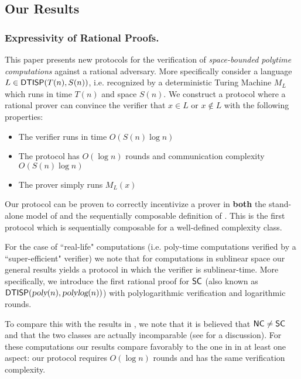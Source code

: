 \subsection{Our Results}

\subsubsection{Expressivity of Rational Proofs.}
This paper presents new protocols for the verification of {\em space-bounded polytime computations} against a rational adversary. More specifically consider a language $L \in {\ensuremath{\mathsf{DTISP}}}(T(n), S(n))$, i.e. recognized by a deterministic Turing Machine $M_L$ which runs in time $T(n)$ and space $S(n)$. 
We construct a protocol where a rational prover can
convince the verifier that $x \in L$ or $x \notin L$ with the following properties: 
\begin{itemize}
	\item The verifier runs in time $O(S(n) \log n)$
	\item The protocol has $O(\log n)$ rounds and communication complexity $O(S(n) \log n)$
	\item The prover simply runs $M_L(x)$ 
\end{itemize}
Our protocol can be proven to correctly incentivize a prover in {\bf both} the stand-alone model of \cite{am} and the sequentially composable definition of \cite{cg15}. This is the first protocol which is sequentially composable for a well-defined complexity class. 

For the case of ``real-life" computations (i.e. poly-time computations verified by a ``super-efficient" verifier) we 
note that for computations in sublinear space our general results yields a protocol in which the verifier is sublinear-time. More specifically, we introduce the first rational proof for ${\mathsf{SC}}$ (also known as ${\mathsf{DTISP}}({\textsl{poly}}(n), {\textsl{polylog}}(n))$) with polylogarithmic verification and logarithmic rounds. 

To compare this with the results in \cite{ratsumchecks}, we note that it is believed that ${\mathsf{NC}} \not = {\mathsf{SC}}$ and that the two classes are actually incomparable (see \cite{SCcompleteness} for a discussion). For these computations our results compare
favorably to the one in \cite{ratsumchecks} in at least one aspect: our protocol requires $O(\log n )$ rounds and has the same verification complexity.

